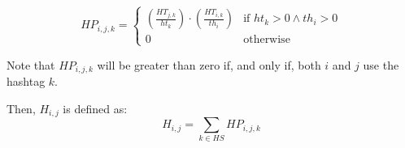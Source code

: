 \begin{equation}
HP_{i,j,k} = \begin{cases}
\left( \frac{ HT_{j,k} }{ ht_k } \right) \cdot \left( \frac{ HT_{i,k} }{ th_i } \right) & \text{if } ht_k > 0 \wedge th_i > 0 \\
0 & \text{otherwise}
\end{cases}
\end{equation}

Note that $HP_{i,j,k}$ will be greater than zero if, and only if, both $i$ and $j$ use the hashtag $k$. 

Then, $H_{i,j}$ is defined as:
\begin{equation}
H_{i,j} = \sum_{k \in HS} HP_{i,j,k}
\end{equation}

